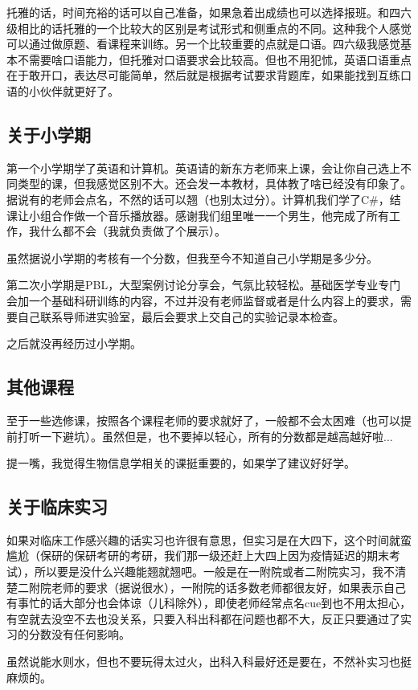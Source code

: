 \documentclass[zihao=-4,fontset=none]{Beautybook-CN}
\begin{document}
托雅的话，时间充裕的话可以自己准备，如果急着出成绩也可以选择报班。和四六级相比的话托雅的一个比较大的区别是考试形式和侧重点的不同。这种我个人感觉可以通过做原题、看课程来训练。另一个比较重要的点就是口语。四六级我感觉基本不需要啥口语能力，但托雅对口语要求会比较高。但也不用犯怵，英语口语重点在于敢开口，表达尽可能简单，然后就是根据考试要求背题库，如果能找到互练口语的小伙伴就更好了。

\subsection{关于小学期}

第一个小学期学了英语和计算机。英语请的新东方老师来上课，会让你自己选上不同类型的课，但我感觉区别不大。还会发一本教材，具体教了啥已经没有印象了。据说有的老师会点名，不然的话可以翘（也别太过分）。计算机我们学了C\#，结课让小组合作做一个音乐播放器。感谢我们组里唯一一个男生，他完成了所有工作，我什么都不会（我就负责做了个展示）。

虽然据说小学期的考核有一个分数，但我至今不知道自己小学期是多少分。

第二次小学期是PBL，大型案例讨论分享会，气氛比较轻松。基础医学专业专门会加一个基础科研训练的内容，不过并没有老师监督或者是什么内容上的要求，需要自己联系导师进实验室，最后会要求上交自己的实验记录本检查。

之后就没再经历过小学期。

\subsection{其他课程}

至于一些选修课，按照各个课程老师的要求就好了，一般都不会太困难（也可以提前打听一下避坑）。虽然但是，也不要掉以轻心，所有的分数都是越高越好啦...

提一嘴，我觉得生物信息学相关的课挺重要的，如果学了建议好好学。

\subsection{关于临床实习}

如果对临床工作感兴趣的话实习也许很有意思，但实习是在大四下，这个时间就蛮尴尬（保研的保研考研的考研，我们那一级还赶上大四上因为疫情延迟的期末考试），所以要是没什么兴趣能翘就翘吧。一般是在一附院或者二附院实习，我不清楚二附院老师的要求（据说很水），一附院的话多数老师都很友好，如果表示自己有事忙的话大部分也会体谅（儿科除外），即使老师经常点名cue到也不用太担心，有空就去没空不去也没关系，只要入科出科都在问题也都不大，反正只要通过了实习的分数没有任何影响。
\begin{theorem}
    虽然说能水则水，但也不要玩得太过火，出科入科最好还是要在，不然补实习也挺麻烦的。
\end{theorem}
\end{document}
